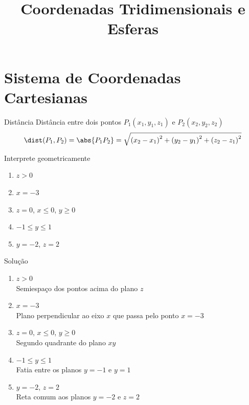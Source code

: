 \documentclass[fleqn,utf8,aspectratio=169,12pt]{beamer}
\title{Coordenadas Tridimensionais e Esferas}
\begin{document}
\addtitle

\section{Sistema de Coordenadas Cartesianas}


\begin{frame}{Distância}
  Distância entre dois pontos \(P_1(x_1, y_1, z_1)\) e  \(P_2(x_2, y_2, z_2)\)
  \[
    \dist(P_1, P_2)
    = \abs{P_1P_2}
    = \sqrt{\left(x_2-x_1\right)^2 + \left(y_2-y_1\right)^2 + \left(z_2-z_1\right)^2}
  \]
\end{frame}

\begin{question}
  Interprete geometricamente
  \begin{enumerate}
    \item \(z > 0\)
    \item \(x = -3\)
    \item \(z=0\), \(x\leq 0\), \(y\geq 0\)
    \item \(-1\leq y \leq 1\)
    \item \(y=-2\), \(z=2\)
  \end{enumerate}
\end{question}

\begin{resolution}{Solução}
  \begin{enumerate}[<+->]
    \item \(z > 0\) \\
          Semiespaço dos pontos acima do plano $z$
    \item \(x = -3\) \\
          Plano perpendicular ao eixo $x$ que passa pelo ponto $x=-3$
    \item \(z=0\), \(x\leq 0\), \(y\geq 0\) \\
          Segundo quadrante do plano $xy$
    \item \(-1\leq y \leq 1\) \\
          Fatia entre os planos \(y=-1\) e \(y=1\)
    \item \(y=-2\), \(z=2\) \\
          Reta comum aos planos \(y=-2\) e \(z=2\)
  \end{enumerate}
\end{resolution}
\end{document}
